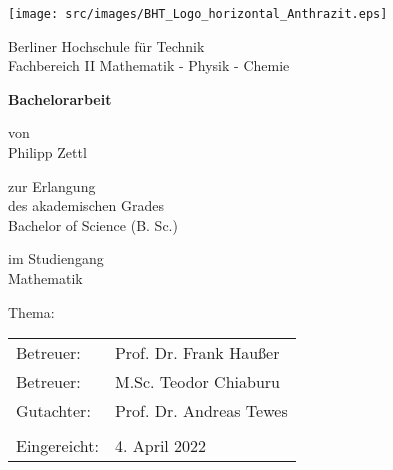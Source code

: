 \begin{titlepage}
    \begin{center}
        \vspace*{1cm}
\begin{center}
    \texttt{[image: src/images/BHT\_Logo\_horizontal\_Anthrazit.eps]}
\end{center}

        Berliner Hochschule für Technik\\
        \vspace{1cm}
        Fachbereich II Mathematik - Physik - Chemie

        \vspace{1.5cm}

        \textbf{Bachelorarbeit}

        \vspace{0.75cm}
        von\\
        \vspace{0.5cm}
        Philipp Zettl\\
        \vspace{0.75cm}

        zur Erlangung\\
        des akademischen Grades\\
        \vspace{.5cm}
        Bachelor of Science (B. Sc.)\\

        \vspace{0.75cm}

        im Studiengang\\
        Mathematik
    \end{center}

    \vspace{1.5cm}
    {
        \raggedleft
        Thema:
    }
    \begin{center}
    \begin{minipage}{.7\textwidth}
            \thesisTitle
    \end{minipage}
    \end{center}
    \vspace{1.5cm}
    {
        \begin{tabular}{l l}
            Betreuer: & Prof. Dr. Frank Haußer\\
            Betreuer: & M.Sc. Teodor Chiaburu\\
            Gutachter: & Prof. Dr. Andreas Tewes\\
            \\
            Eingereicht: & 4. April 2022
        \end{tabular}
    }
\end{titlepage}
